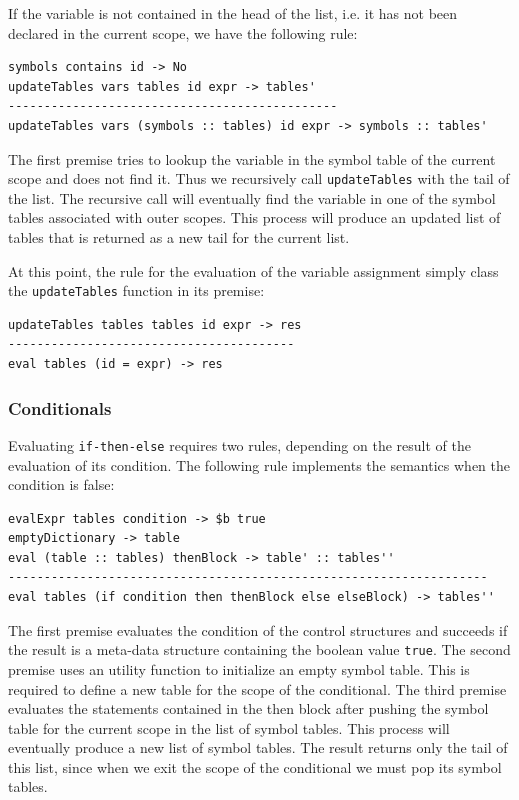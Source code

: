 If the variable is not contained in the head of the list, i.e. it has not been declared in the current scope, we have the following rule:

\begin{lstlisting}
symbols contains id -> No
updateTables vars tables id expr -> tables'
----------------------------------------------
updateTables vars (symbols :: tables) id expr -> symbols :: tables'
\end{lstlisting}

The first premise tries to lookup the variable in the symbol table of the current scope and does not find it. Thus we recursively call \texttt{updateTables} with the tail of the list. The recursive call will eventually find the variable in one of the symbol tables associated with outer scopes. This process will produce an updated list of tables that is returned as a new tail for the current list.

At this point, the rule for the evaluation of the variable assignment simply class the \texttt{updateTables} function in its premise:

\begin{lstlisting}
updateTables tables tables id expr -> res
----------------------------------------
eval tables (id = expr) -> res
\end{lstlisting}

\subsubsection{Conditionals}

Evaluating \texttt{if-then-else} requires two rules, depending on the result of the evaluation of its condition. The following rule implements the semantics when the condition is false:

\begin{lstlisting}
evalExpr tables condition -> $b true
emptyDictionary -> table
eval (table :: tables) thenBlock -> table' :: tables''
-------------------------------------------------------------------
eval tables (if condition then thenBlock else elseBlock) -> tables''
\end{lstlisting}

The first premise evaluates the condition of the control structures and succeeds if the result is a meta-data structure containing the boolean value \texttt{true}. The second premise uses an utility function to initialize an empty symbol table. This is required to define a new table for the scope of the conditional. The third premise evaluates the statements contained in the then block after pushing the symbol table for the current scope in the list of symbol tables. This process will eventually produce a new list of symbol tables. The result returns only the tail of this list, since when we exit the scope of the conditional we must pop its symbol tables.

